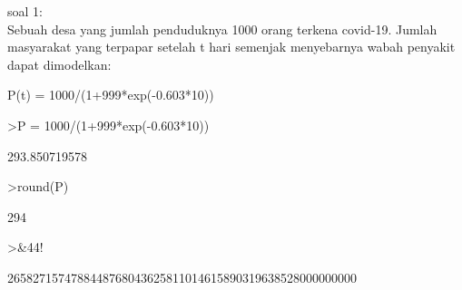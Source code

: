 \documentclass[12pt,Times new roman,letterpaper]{book}
\begin{document}
\begin{eulernootebook}
\begin{eulercomment}
\begin{eulercomment}
\begin{eulercomment}
soal 1:\\
Sebuah desa yang jumlah penduduknya 1000 orang terkena covid-19.
Jumlah masyarakat yang terpapar setelah t hari semenjak menyebarnya
wabah penyakit dapat dimodelkan:

P(t) = 1000/(1+999*exp(-0.603*10))
\end{eulercomment}
\begin{eulerprompt}
>P = 1000/(1+999*exp(-0.603*10))
\end{eulerprompt}
\begin{euleroutput}
  293.850719578
\end{euleroutput}
\begin{eulerprompt}
>round(P)
\end{eulerprompt}
\begin{euleroutput}
  294
\end{euleroutput}
\begin{eulerprompt}
>&44!
\end{eulerprompt}
\begin{euleroutput}
  
          2658271574788448768043625811014615890319638528000000000
  

\end{euleroutput}
\end{eulercomment}
\end{eulercomment}
\end{eulernootebook}
\end{document}

